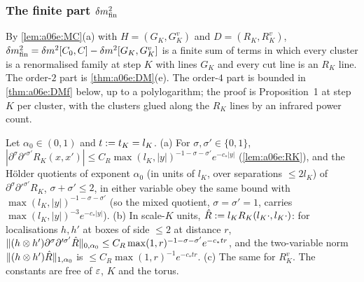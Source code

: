 
\subsubsection*{The finite part $\delta m^2_{\mathrm{fin}}$}

By \cref{lem:a06e:MC}(a) with $H=(G_K,G^v_K)$ and $D=(R_K,R^v_K)$, $\delta m^2_{\mathrm{fin}}=\delta m^2[C_0,C]-\delta m^2[G_K,G^v_K]$ is a finite sum of terms in which every cluster is a renormalised family at step $K$ with lines $G_K$ and every cut line is an $R_K$ line. The order-$2$ part is \cref{thm:a06e:DM}(e). The order-$4$ part is bounded in \cref{thm:a06e:DMf} below, up to a polylogarithm; the proof is Proposition~1 at step $K$ per cluster, with the clusters glued along the $R_K$ lines by an infrared power count.

\begin{lemma}\label{lem:a06e:RKp}
Let $\alpha_0\in(0,1)$ and $t:= t_K=l_K$. \textup{(a)} For $\sigma,\sigma'\in\{0,1\}$, $|\partial^\sigma\partial'^{\sigma'}R_K(x,x')|\le C_R\max(l_K,|y|)^{-1-\sigma-\sigma'}e^{-c_*|y|}$ (\cref{lem:a06e:RK}), and the H\"older quotients of exponent $\alpha_0$ (in units of $l_K$, over separations $\le2l_K$) of $\partial^\sigma\partial'^{\sigma'}R_K$, $\sigma+\sigma'\le2$, in either variable obey the same bound with $\max(l_K,|y|)^{-1-\sigma-\sigma'}$ (so the mixed quotient, $\sigma=\sigma'=1$, carries $\max(l_K,|y|)^{-3}e^{-c_*|y|}$). \textup{(b)} In scale-$K$ units, $\hat R:= l_KR_K(l_K\cdot,l_K\cdot)$: for localisations $h,h'$ at boxes of side $\le2$ at distance $r$, $\lVert (h\otimes h')\partial^\sigma\partial'^{\sigma'}\hat R\rVert_{0,\alpha_0}\le C_R\max(1,r)^{-1-\sigma-\sigma'}e^{-c_*tr}$, and the two-variable norm $\lVert (h\otimes h')\hat R\rVert_{1,\alpha_0}$ is $\le C_R\max(1,r)^{-1}e^{-c_*tr}$. \textup{(c)} The same for $R^v_K$. The constants are free of $\varepsilon$, $K$ and the torus.
\end{lemma}

